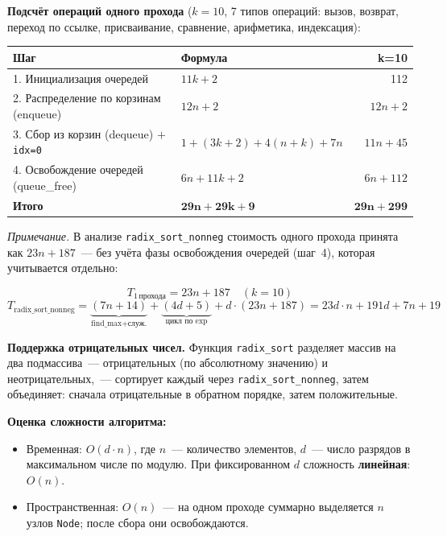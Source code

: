 \documentclass[a4paper,14pt]{extarticle}
\begin{document}
\textbf{Подсчёт операций одного прохода} ($k = 10$, 7 типов операций: вызов, возврат, переход по ссылке, присваивание, сравнение, арифметика, индексация):

\begin{center}
\begin{tabular}{|l|l|r|}
\hline
\textbf{Шаг} & \textbf{Формула} & \textbf{k=10} \\
\hline
1. Инициализация очередей                          & $11k + 2$            & 112 \\
\hline
2. Распределение по корзинам (enqueue)             & $12n + 2$            & $12n+2$ \\
\hline
3. Сбор из корзин (dequeue) $+$ \texttt{idx=0}     & $1 + (3k+2) + 4(n+k) + 7n$ & $11n+45$ \\
\hline
4. Освобождение очередей (queue\_free)             & $6n + 11k + 2$       & $6n+112$ \\
\hline
\textbf{Итого}                                     & $\mathbf{29n + 29k + 9}$ & $\mathbf{29n + 299}$ \\
\hline
\end{tabular}
\end{center}

\textit{Примечание.} В анализе \texttt{radix\_sort\_nonneg} стоимость одного прохода принята как $23n + 187$~--- без учёта фазы освобождения очередей (шаг~4), которая учитывается отдельно:

\[
  T_{1\,\text{прохода}} = 23n + 187 \quad (k{=}10)
\]
\[
  T_{\text{radix\_sort\_nonneg}} = \underbrace{(7n+14)}_{\text{find\_max} + \text{служ.}}
    + \underbrace{(4d+5)}_{\text{цикл по exp}}
    + d\cdot(23n + 187)
    = 23d\cdot n + 191d + 7n + 19
\]

\textbf{Поддержка отрицательных чисел.} Функция \texttt{radix\_sort} разделяет массив на два подмассива~--- отрицательных (по абсолютному значению) и неотрицательных,~--- сортирует каждый через \texttt{radix\_sort\_nonneg}, затем объединяет: сначала отрицательные в обратном порядке, затем положительные.

\textbf{Оценка сложности алгоритма:}
\begin{itemize}
  \item Временная: $O(d \cdot n)$, где $n$~--- количество элементов, $d$~--- число разрядов в максимальном числе по модулю. При фиксированном $d$ сложность \textbf{линейная}: $O(n)$.
  \item Пространственная: $O(n)$~--- на одном проходе суммарно выделяется $n$ узлов \texttt{Node}; после сбора они освобождаются.
\end{itemize}
\end{document}
